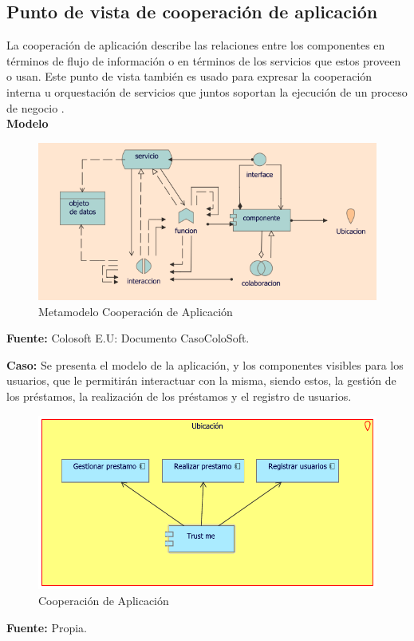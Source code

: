 	\subsection{Punto de vista de cooperación de aplicación}
	{La  cooperación de aplicación describe las relaciones entre los componentes en términos de flujo de información o en términos de los servicios que estos proveen o usan. Este punto de vista también es usado para expresar la cooperación interna u orquestación de servicios que juntos soportan la ejecución de un proceso de negocio \cite{archimate}.\\
		
		\textbf{Modelo}\\
		\begin{figure}[H]
			\centering
			\includegraphics[width=0.8\linewidth]{development/cooperacionapp.png}
			\caption{Metamodelo Cooperación de Aplicación}
		\end{figure}
		\begin{center}
			\textbf{Fuente:} Colosoft E.U: Documento CasoColoSoft.
		\end{center}
		\hfill \break
		
		\textbf{Caso:} Se presenta  el modelo de la aplicación, y los componentes visibles para los usuarios, que le permitirán interactuar con la misma, siendo estos, la gestión de los préstamos, la realización de los préstamos y el registro de usuarios.\\
		
		\begin{figure}[H]
			\centering
			\includegraphics[width=0.7\linewidth]{development/cooperacionapp.pdf}
			\caption{Cooperación de Aplicación}
		\end{figure}
		\begin{center}
			\textbf{Fuente:} Propia.
		\end{center}
	}
	
